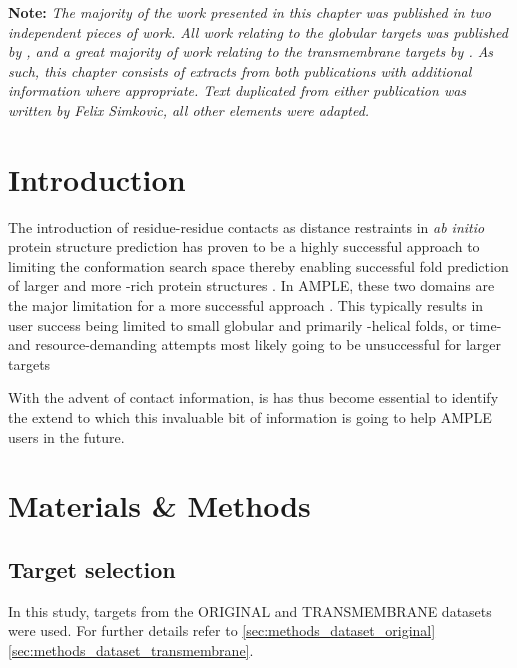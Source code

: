 \textbf{Note: }\textit{The majority of the work presented in this chapter was published in two independent pieces of work. All work relating to the globular targets was published by \textcite{Simkovic2016-wk}, and a great majority of work relating to the transmembrane targets by \textcite{Thomas2017-sh}. As such, this chapter consists of extracts from both publications with additional information where appropriate. Text duplicated from either publication was written by Felix Simkovic, all other elements were adapted.}

\section{Introduction}
The introduction of residue-residue contacts as distance restraints in \textit{ab initio} protein structure prediction has proven to be a highly successful approach to limiting the conformation search space thereby enabling successful fold prediction of larger and more \textbeta-rich protein structures \cite[e.g.,][]{Marks2011-os,Michel2014-eg,Kosciolek2014-bt,Ovchinnikov2015-tn,Ovchinnikov2016-jj,Michel2017-xh,De_Oliveira2017-sg,Ovchinnikov2017-nd,Wang2017-rx}. In AMPLE, these two domains are the major limitation for a more successful approach \cite{Bibby2012-lm}. This typically results in user success being limited to small globular and primarily \textalpha-helical folds, or time- and resource-demanding attempts most likely going to be unsuccessful for larger targets

With the advent of contact information, is has thus become essential to identify the extend to which this invaluable bit of information is going to help AMPLE users in the future. 

\section{Materials \& Methods}
\subsection{Target selection}
In this study, targets from the ORIGINAL and TRANSMEMBRANE datasets were used. For further details refer to \cref{sec:methods_dataset_original} \cref{sec:methods_dataset_transmembrane}.

